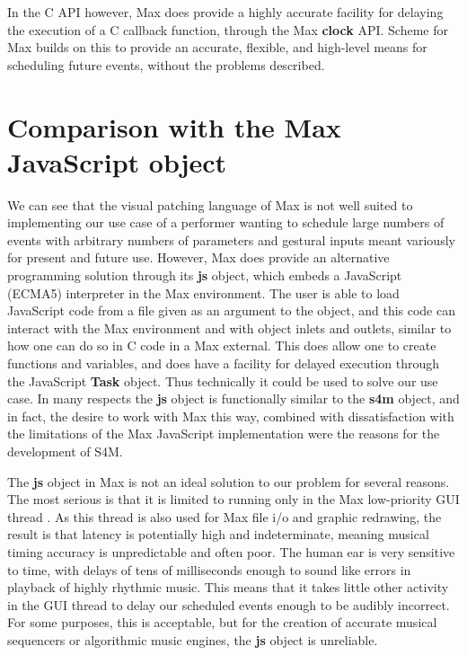 \documentclass[acmsmall]{acmart}
\begin{document}
In the C API however, Max does provide a highly accurate facility for delaying
the execution of a C callback function, through the Max \textbf{clock} API. Scheme
for Max builds on this to provide an accurate, flexible, and high-level means 
for scheduling future events, without the problems described.

\section{Comparison with the Max JavaScript object}

We can see that the visual patching language of Max is not well suited to implementing
our use case of a performer wanting to schedule large numbers of events with arbitrary numbers of
parameters and gestural inputs meant variously for present and future use. 
However, Max does provide an alternative programming solution through its
\textbf{js} object, which embeds a JavaScript (ECMA5) interpreter in the Max environment.
The user is able to load JavaScript code from a file given as an argument to the object,
and this code can interact with the Max environment and with object inlets and outlets,
similar to how one can do so in C code in a Max external.
This does allow one to create functions and variables, and does have a facility
for delayed execution through the JavaScript \textbf{Task} object. 
Thus technically it could be used to solve our use case.
In many respects the \textbf{js} object is functionally similar to the \textbf{s4m} object,
and in fact, the desire to work with Max this way, combined with dissatisfaction with the
limitations of the Max JavaScript implementation were the reasons for the development of S4M.

The \textbf{js} object in Max is not an ideal solution to our problem for several reasons. 
The most serious is that it is limited to running only in the Max low-priority GUI thread \cite{Cycling74}.
As this thread is also used for Max file i/o and graphic redrawing, the result is that latency
is potentially high and indeterminate, meaning musical timing accuracy is unpredictable and often poor.
The human ear is very sensitive to time, with delays of tens of milliseconds enough to sound like errors in playback
of highly rhythmic music. This means that it takes little other activity in the
GUI thread to delay our scheduled events enough to be audibly incorrect. 
For some purposes, this is acceptable, but for the creation of accurate 
musical sequencers or algorithmic music engines, the \textbf{js} object is unreliable. 
\end{document}
